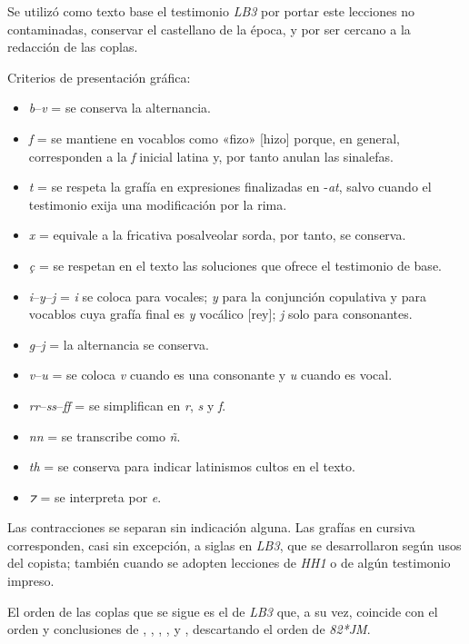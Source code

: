 \documentclass[11pt,a4paper,twoside]{article}
\newcommand{\comillas}[1]{«#1»}
\begin{document}
Se utilizó como texto base el testimonio \emph{LB3} por portar este lecciones no contaminadas, conservar el castellano de la época, y por ser cercano a la redacción de las coplas.\par
%
Criterios de presentación gráfica:
%
\begin{itemize}[label=--]%
\item \emph{b}--\emph{v} = se conserva la alternancia.
\item \emph{f} = se mantiene en vocablos como \comillas{fizo} [hizo] porque, en general, corresponden a la \emph{f} inicial latina y, por tanto anulan las sinalefas.
\item \emph{t} = se respeta la grafía en expresiones finalizadas en -\emph{at}, salvo cuando el testimonio exija una modificación por la rima.
\item \emph{x} = equivale a la fricativa posalveolar sorda, por tanto, se conserva.
\item \emph{ç} = se respetan en el texto las soluciones que ofrece el testimonio de base.
\item \emph{i}--\emph{y}--\emph{j} = \emph{i} se coloca para vocales; \emph{y} para la conjunción copulativa y para vocablos cuya grafía final es \emph{y} vocálico [rey]; \emph{j} solo para consonantes.
\item \emph{g}--\emph{j} = la alternancia se conserva.
\item \emph{v}--\emph{u} = se coloca \emph{v} cuando es una consonante y \emph{u} cuando es vocal.
\item \emph{rr}--\emph{ss}--\emph{ff} = se simplifican en \emph{r}, \emph{s} y \emph{f}.
\item \emph{nn} = se transcribe como \emph{ñ}.
\item \emph{th} = se conserva para indicar latinismos cultos en el texto.
\item \emph{⁊} = se interpreta por \emph{e}.%
\end{itemize}\par
%
Las contracciones se separan sin indicación alguna. Las grafías en cursiva corresponden, casi sin excepción, a siglas en \emph{LB3}, que se desarrollaron según usos del copista; también cuando se adopten lecciones de \emph{HH1} o de algún testimonio impreso.\par
%
El orden de las coplas que se sigue es el de \emph{LB3} que, a su vez, coincide con el orden y conclusiones de \textcite{Senabre1983}, \textcite{Palumbo1983}, \textcite{Orduna1967}, \textcite{Beltrán1991,Beltrán2013}, \textcite{PérezPriego1990,PérezPriego2017} y \parencite{Foulché-Delbosc1902}, descartando el orden de \emph{82*JM}.\par
\end{document}
